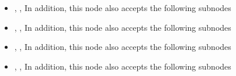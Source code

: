 \begin{itemize}
  \DenseLayer
  \DropoutLayer
  \item {}, ,
    \layerNameAttr
    In addition, this node also accepts the following subnodes
    \begin{itemize}
        \activation
        \dimOut
        \useBias
        \strides
        \padding
        \dataFormat
        \dilationRate
        \biasInitializer
        \biasRegularizer
        \activityRegularizer
        \biasConstraint
    \end{itemize}

  \item {}, ,
    In addition, this node also accepts the following subnodes
    \begin{itemize}
        \activation
        \dimOut
        \useBias
        \strides
        \padding
        \dataFormat
        \dilationRate
        \biasInitializer
        \biasRegularizer
        \activityRegularizer
        \biasConstraint
    \end{itemize}

  \item {}, ,
    In addition, this node also accepts the following subnodes
    \begin{itemize}
        \activation
        \dimOut
        \useBias
        \strides
        \padding
        \dataFormat
        \dilationRate
        \biasInitializer
        \biasRegularizer
        \activityRegularizer
        \biasConstraint
    \end{itemize}

  \item {}, ,
    In addition, this node also accepts the following subnodes
    \begin{itemize}
        \dataFormat
    \end{itemize}

\end{itemize}


